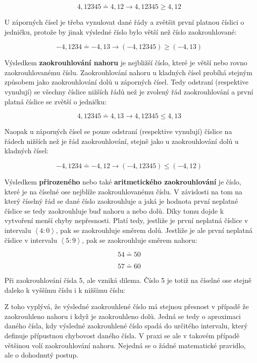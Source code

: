 $$ 4,12345 \doteq 4,12 \rightarrow 4,12345 \geq 4,12 $$

U záporných čísel je třeba vynulovat dané řády a zvětšit první platnou číslici o jedničku, protože by jinak výsledné číslo bylo větší než číslo zaokrouhlované:

$$ -4,1234 \doteq -4,13 \rightarrow (-4,12345) \geq (-4,13) $$

Výsledkem {\bf zaokrouhlování nahoru} je nejbližší  číslo, které je větší nebo rovno zaokrouhlovanému číslu. Zaokrouhlování nahoru u kladných čísel probíhá stejným způsobem jako zaokrouhlování dolů u záporných čísel. Tedy odstraní (respektive vynulují) se všechny číslice nižších řádů než je zvolený řád zaokrouhlování a první platná číslice se zvětší o jedničku:

$$ 4,12345 \doteq 4,13 \rightarrow 4,12345 \leq 4,13 $$

Naopak u záporných čísel se pouze odstraní (respektive vynulují) číslice na řádech nižších než je řád zaokrouhlování, stejně jako u zaokrouhlování dolů u kladných čísel:

$$ -4,1234 \doteq -4,12 \rightarrow (-4,12345) \leq (-4,12) $$

Výsledkem {\bf přirozeného} nebo také {\bf aritmetického zaokrouhlování} je číslo, které je na číselné ose nejblíže zaokrouhlovanému číslu. V závislosti na tom na který číselný řád se dané číslo zaokrouhluje a jaká je hodnota první neplatné číslice se tedy zaokrouhluje buď nahoru a nebo dolů. Díky tomu dojde k vytvoření menší chyby nepřesnosti. Platí tedy, jestliže je první neplatná číslice v intervalu $\left< 4:0 \right>$, pak se zaokrouhluje směrem dolů. Jestliže je ale první neplatná číslice v intervalu $\left< 5:9 \right>$, pak se zaokrouhluje směrem nahoru:

$$ 54 \doteq 50 $$

$$ 57 \doteq 60 $$

\vskip 4mm
\centerline{}
\vskip 4mm

Při zaokrouhlování čísla 5, ale vzniká dilema. Číslo 5 je totiž na číselné ose stejně daleko k vyššímu číslu i k nižšímu číslu:

\vskip 4mm
\centerline{}
\vskip 4mm

Z toho vyplývá, že výsledné zaokrouhlené číslo má stejnou přesnost v případě že zaokrouhleno nahoru i když je zaokrouhleno dolů. Jedná se tedy o aproximaci daného čísla, kdy výsledné zaokrouhlené číslo spadá do určitého intervalu, který definuje přípustnou chybovost daného čísla. V praxi se ale v takovém případě většinou volí zaokrouhlování nahoru. Nejedná se o žádné matematické pravidlo, ale o dohodnutý postup.


